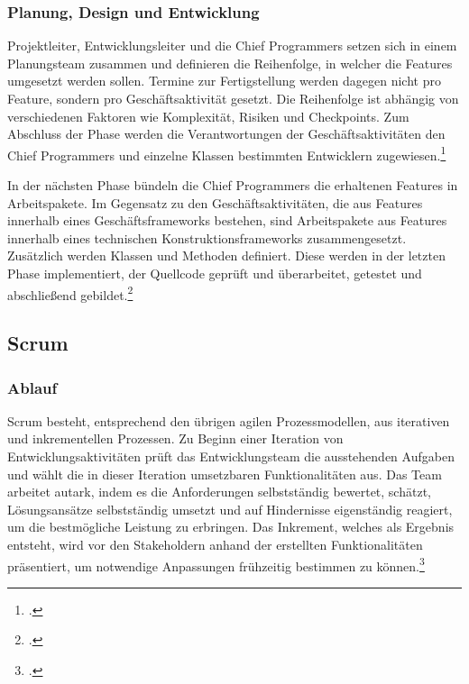 \subsubsection{Planung, Design und Entwicklung}
Projektleiter, Entwicklungsleiter und die Chief Programmers setzen sich in einem Planungsteam zusammen und definieren die Reihenfolge, in welcher die Features umgesetzt werden sollen. Termine zur Fertigstellung werden dagegen nicht pro Feature, sondern pro Geschäftsaktivität gesetzt. Die Reihenfolge ist abhängig von verschiedenen Faktoren wie Komplexität, Risiken und Checkpoints. Zum Abschluss der Phase werden die Verantwortungen der Geschäftsaktivitäten den Chief Programmers und einzelne Klassen bestimmten Entwicklern zugewiesen.\footcite[Vgl.][Seite 276 f.]{highsmith}

In der nächsten Phase bündeln die Chief Programmers die erhaltenen Features in Arbeitspakete. Im Gegensatz zu den Geschäftsaktivitäten, die aus Features innerhalb eines Geschäftsframeworks bestehen, sind Arbeitspakete aus Features innerhalb eines technischen Konstruktionsframeworks zusammengesetzt. Zusätzlich werden Klassen und Methoden definiert. Diese werden in der letzten Phase implementiert, der Quellcode geprüft und überarbeitet, getestet und abschließend gebildet.\footcite[Vgl.][Seite 277 f.]{highsmith}

\subsection{Scrum}
\subsubsection{Ablauf}
Scrum besteht, entsprechend den übrigen agilen Prozessmodellen, aus iterativen und inkrementellen Prozessen. Zu Beginn einer Iteration von Entwicklungsaktivitäten prüft das Entwicklungsteam die ausstehenden Aufgaben und wählt die in dieser Iteration umsetzbaren Funktionalitäten aus. Das Team arbeitet autark, indem es die Anforderungen selbstständig bewertet, schätzt, Lösungsansätze selbstständig umsetzt und auf Hindernisse eigenständig reagiert, um die bestmögliche Leistung zu erbringen. Das Inkrement, welches als Ergebnis entsteht, wird vor den Stakeholdern anhand der erstellten Funktionalitäten präsentiert, um notwendige Anpassungen frühzeitig bestimmen zu können.\footcite[Vgl.][Seite 6]{schwabo}

